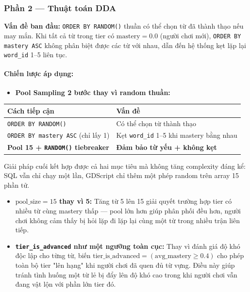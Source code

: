 \subsubsection{Phần 2 — Thuật toán DDA}
\textbf{Vấn đề ban đầu:} \texttt{ORDER BY RANDOM()} thuần có thể chọn từ đã thành thạo nếu may mắn. Khi tất cả từ trong tier có $\text{mastery} = 0.0$ (người chơi mới), \texttt{ORDER BY mastery ASC} không phân biệt được các từ với nhau, dẫn đến hệ thống kẹt lặp lại \texttt{word\_id} 1–5 liên tục.

\paragraph{Chiến lược áp dụng:}
\begin{itemize}
    \item \textbf{Pool Sampling 2 bước thay vì random thuần:}
\end{itemize}
\begin{table}[h!]
\centering
\small
\begin{tabularx}{\textwidth}{|l |X|}
\toprule
\textbf{Cách tiếp cận} & \textbf{Vấn đề} \\
\midrule
\texttt{ORDER BY RANDOM()} & Có thể chọn từ thành thạo \\
\texttt{ORDER BY mastery ASC} (chỉ lấy 1) & Kẹt \texttt{word\_id} 1–5 khi mastery bằng nhau \\
\textbf{Pool 15 + \texttt{RANDOM()} tiebreaker} & \textbf{Đảm bảo từ yếu + không kẹt} \\
\bottomrule
\end{tabularx}
\end{table}

Giải pháp cuối kết hợp được cả hai mục tiêu mà không tăng complexity đáng kể: SQL vẫn chỉ chạy một lần, GDScript chỉ thêm một phép random trên array 15 phần tử.

\begin{itemize}
    \item \textbf{$\text{pool\_size} = 15$ thay vì 5:} Tăng từ 5 lên 15 giải quyết trường hợp tier có nhiều từ cùng mastery thấp — pool lớn hơn giúp phân phối đều hơn, người chơi không cảm thấy bị hỏi lặp đi lặp lại cùng một từ trong nhiều trận liên tiếp.
    \item \textbf{\texttt{tier\_is\_advanced} như một ngưỡng toàn cục:} Thay vì đánh giá độ khó độc lập cho từng từ, biến $\text{tier\_is\_advanced} = (\text{avg\_mastery} \ge 0.4)$ cho phép toàn bộ tier "lên hạng" khi người chơi đã quen đủ từ vựng. Điều này giúp tránh tình huống một từ lẻ bị đẩy lên độ khó cao trong khi người chơi vẫn đang vật lộn với phần lớn tier đó.
\end{itemize}



